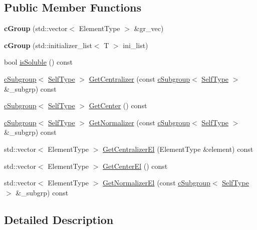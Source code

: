 \subsection*{\-Public \-Member \-Functions}
\begin{DoxyCompactItemize}
\item 
\hypertarget{classcGroup_a28f87c232c9d07ba9f9b0ec159e8243a}{{\bfseries c\-Group} (std\-::vector$<$ \-Element\-Type $>$ \&gr\-\_\-vec)}\label{classcGroup_a28f87c232c9d07ba9f9b0ec159e8243a}

\item 
\hypertarget{classcGroup_a38b515a0db10fa1fcebe7b635fc0d481}{{\bfseries c\-Group} (std\-::initializer\-\_\-list$<$ \-T $>$ ini\-\_\-list)}\label{classcGroup_a38b515a0db10fa1fcebe7b635fc0d481}

\item 
bool \hyperlink{classcGroup_acb69bf5f56805920d414a80ac5e54f36}{is\-Soluble} () const 
\item 
\hyperlink{classcSubgroup}{c\-Subgroup}$<$ \hyperlink{classcGroup}{\-Self\-Type} $>$ \hyperlink{classcGroup_aeb4a24d613e509f3f62c1c5ff35bf6fa}{\-Get\-Centralizer} (const \hyperlink{classcSubgroup}{c\-Subgroup}$<$ \hyperlink{classcGroup}{\-Self\-Type} $>$ \&\-\_\-subgrp) const 
\item 
\hyperlink{classcSubgroup}{c\-Subgroup}$<$ \hyperlink{classcGroup}{\-Self\-Type} $>$ \hyperlink{classcGroup_a4d17719549b887692c2155fc2651cf72}{\-Get\-Center} () const 
\item 
\hyperlink{classcSubgroup}{c\-Subgroup}$<$ \hyperlink{classcGroup}{\-Self\-Type} $>$ \hyperlink{classcGroup_a1bcc2cdb6db5251b23cd099b25ffa057}{\-Get\-Normalizer} (const \hyperlink{classcSubgroup}{c\-Subgroup}$<$ \hyperlink{classcGroup}{\-Self\-Type} $>$ \&\-\_\-subgrp) const 
\item 
std\-::vector$<$ \-Element\-Type $>$ \hyperlink{classcGroup_abe24cddf57cff0f63b5f24537eca9784}{\-Get\-Centralizer\-El} (\-Element\-Type \&element) const 
\item 
std\-::vector$<$ \-Element\-Type $>$ \hyperlink{classcGroup_a09c9a617410517ccefc53214ba8e9e91}{\-Get\-Center\-El} () const 
\item 
std\-::vector$<$ \-Element\-Type $>$ \hyperlink{classcGroup_a442a90478046593d38f5d131eb22b9a9}{\-Get\-Normalizer\-El} (const \hyperlink{classcSubgroup}{c\-Subgroup}$<$ \hyperlink{classcGroup}{\-Self\-Type} $>$ \&\-\_\-subgrp) const 
\end{DoxyCompactItemize}


\subsection{\-Detailed \-Description}
